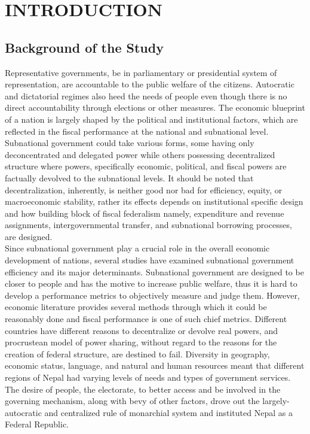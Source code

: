 \newpage
{}
\section{INTRODUCTION} 
\subsection{Background of the Study}
Representative governments, be in parliamentary or presidential system of representation, are accountable to the public welfare of the citizens. Autocratic and dictatorial regimes also heed the needs of people even though there is no direct accountability\cite{Gilli2014} through elections or other measures. The economic blueprint of a nation is largely shaped by the political and institutional factors, which are reflected in the fiscal performance at the national and subnational level\cite{Rattso1998, Dafflon2002}. Subnational government could take various forms, some having only deconcentrated and delegated power while others possessing decentralized structure where powers, specifically economic, political, and fiscal powers are factually devolved to the subnational levels. It should be noted that decentralization, inherently, is neither good nor bad for efficiency, equity, or macroeconomic stability, rather its effects depends on institutional specific design and how building block of fiscal federalism namely, expenditure and revenue assignments, intergovernmental transfer, and subnational borrowing processes, are designed\cite{Alt1994}. \\
Since subnational government play a crucial role in the overall economic development of nations, several studies have examined subnational government efficiency and its major determinants\cite{Deborger1994, Worthington2000, Geys2006, Bruns2008}. Subnational government are designed to be closer to people and has the motive to increase public welfare, thus it is hard to develop a performance metrics to objectively measure and judge them\cite{Gray2006}. However, economic literature provides several methods through which it could be reasonably done and fiscal performance is one of such chief metrics. Different countries have different reasons to decentralize or devolve real powers, and procrustean model of power sharing, without regard to the reasons for the creation of federal structure, are destined to fail. Diversity in geography, economic status, language, and natural and human resources meant that different regions of Nepal had varying levels of needs and types of government services. The desire of people, the electorate, to better access and be involved in the governing mechanism, along with bevy of other factors,  drove out the largely-autocratic and centralized rule of monarchial system and instituted Nepal as a Federal Republic.\\
